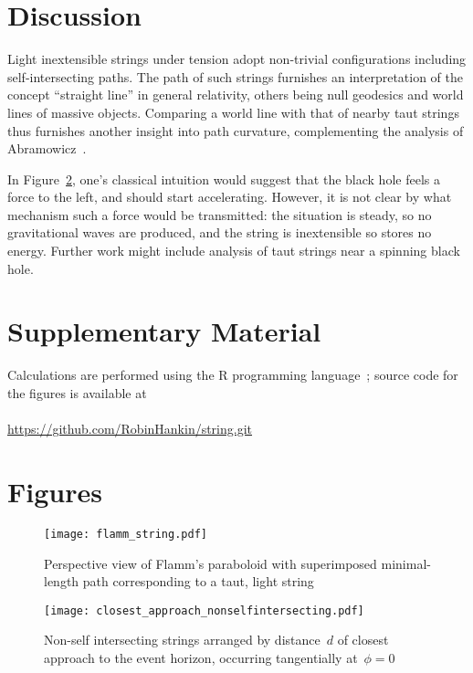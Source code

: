 \documentclass[prb,preprint]{revtex4-1}
\begin{document}
\section{Discussion}

Light inextensible strings under tension adopt non-trivial
configurations including self-intersecting paths.  The path of such
strings furnishes an interpretation of the concept ``straight line''
in general relativity, others being null geodesics and world lines of
massive objects.  Comparing a world line with that of nearby taut
strings thus furnishes another insight into path curvature,
complementing the analysis of Abramowicz~\cite{abramowicz1992}.

In Figure~\ref{closest_approach_non_self_intersecting}, one's
classical intuition would suggest that the black hole feels a force to
the left, and should start accelerating.  However, it is not clear by
what mechanism such a force would be transmitted: the situation is
steady, so no gravitational waves are produced, and the string is
inextensible so stores no energy.  Further work might include analysis
of taut strings near a spinning black hole.




\section*{Supplementary Material}

Calculations are performed using the R programming language~\citep{rcore2018};
source code for the figures is available at
\\
\\
\url{https://github.com/RobinHankin/string.git}


\section*{Figures}

\begin{figure}[h!] %
\centering
\texttt{[image: flamm\_string.pdf]}
\caption{Perspective view of Flamm's paraboloid with superimposed minimal-length
  path corresponding to a taut, light string}
\label{flamm}
\end{figure}

\begin{figure}[p] %
\centering
\texttt{[image: closest\_approach\_nonselfintersecting.pdf]}
\caption{Non-self intersecting strings arranged by distance~$d$ of
  closest approach to the event horizon, occurring tangentially
  at~$\phi=0$}
\label{closest_approach_non_self_intersecting}
\end{figure}
\end{document}

